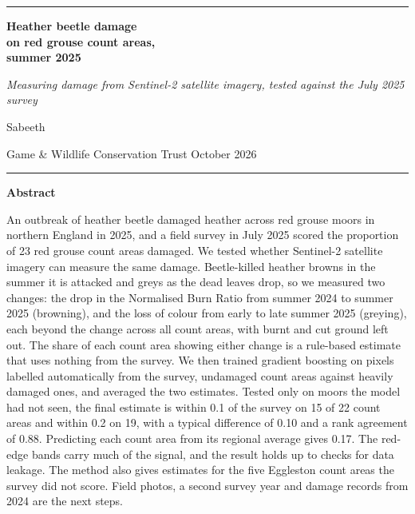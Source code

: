 \documentclass[11pt,a4paper]{article}
\begin{document}
\begin{titlepage}
\raggedright
{\color{accent}\rule{\linewidth}{1.6pt}}\par\vspace{0.9cm}
{\fontsize{27}{34}\selectfont\bfseries\color{accent}Heather beetle damage\\ on red grouse count areas,\\ summer 2025\par}
\vspace{0.45cm}
{\Large\itshape\color{muted}Measuring damage from Sentinel-2 satellite imagery, tested against the July 2025 survey\par}
\vspace{0.7cm}
{\sffamily\large Sabeeth\par}
{\sffamily\normalsize\color{muted}Game \& Wildlife Conservation Trust \enspace\textbullet\enspace October 2026\par}
\vspace{0.6cm}
{\color{rulegrey}\rule{\linewidth}{0.5pt}}\par
\vspace{0.7cm}
\begin{tcolorbox}[enhanced,colback=accentlight,colframe=accentlight,arc=1.5pt,left=11pt,right=11pt,top=9pt,bottom=9pt]
{\sffamily\bfseries\color{accent}Abstract}\par\vspace{0.3em}
\small
An outbreak of heather beetle damaged heather across red grouse moors in northern England in 2025, and a field survey in July 2025 scored the proportion of 23 red grouse count areas damaged. We tested whether Sentinel-2 satellite imagery can measure the same damage. Beetle-killed heather browns in the summer it is attacked and greys as the dead leaves drop, so we measured two changes: the drop in the Normalised Burn Ratio from summer 2024 to summer 2025 (browning), and the loss of colour from early to late summer 2025 (greying), each beyond the change across all count areas, with burnt and cut ground left out. The share of each count area showing either change is a rule-based estimate that uses nothing from the survey. We then trained gradient boosting on pixels labelled automatically from the survey, undamaged count areas against heavily damaged ones, and averaged the two estimates. Tested only on moors the model had not seen, the final estimate is within 0.1 of the survey on 15 of 22 count areas and within 0.2 on 19, with a typical difference of 0.10 and a rank agreement of 0.88. Predicting each count area from its regional average gives 0.17. The red-edge bands carry much of the signal, and the result holds up to checks for data leakage. The method also gives estimates for the five Eggleston count areas the survey did not score. Field photos, a second survey year and damage records from 2024 are the next steps.

\end{tcolorbox}
\end{titlepage}
\end{document}
